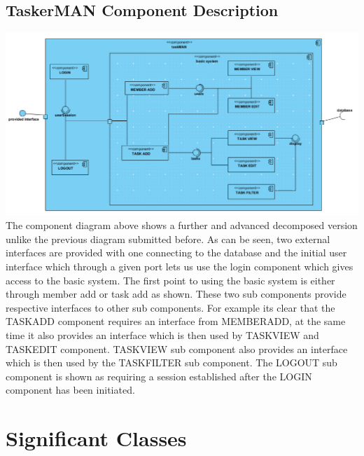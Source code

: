\documentclass{project}
\begin{document}
\subsection{TaskerMAN Component Description}
\includegraphics[width=1\textwidth, center]{images/Detailed-Design/TaskerMANComponentDiagram}
The component diagram above shows a further and advanced decomposed version unlike the previous diagram submitted before.  As can be seen, two external interfaces are provided with one connecting to the database and the initial user interface which through a given port lets us use the login component which gives access to the basic system.  The first point to using the basic system is either through member add or task add as shown. These two sub components provide respective interfaces to other sub components.  For example its clear that the TASK\textunderscore ADD component requires  an interface from MEMBER\textunderscore ADD, at the same time it also provides an interface which is then used by TASK\textunderscore VIEW and TASK\textunderscore EDIT component. TASK\textunderscore VIEW sub component also provides an interface which is then used by the TASK\textunderscore FILTER sub component. 
The LOGOUT sub component is shown as requiring a session established after the LOGIN component has been initiated. 
\clearpage
\section{Significant Classes} 
\end{document}
